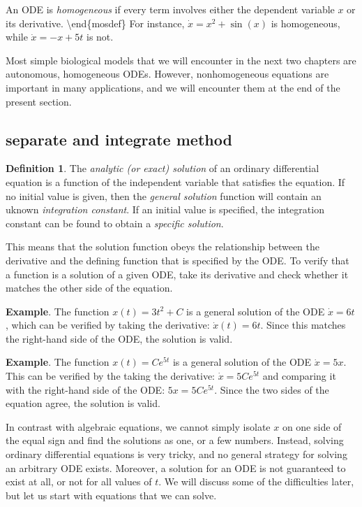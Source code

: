 \documentclass[
]{book}
\theoremstyle{definition}
\newtheorem{definition}{Definition}[chapter]
\theoremstyle{definition}
\theoremstyle{definition}
\theoremstyle{remark}
\begin{document}
An ODE is \emph{homogeneous} if every term involves either the dependent variable \(x\) or its derivative.
\textbackslash end\{mosdef\}
For instance, \(\dot x = x^2 + \sin(x)\) is homogeneous, while \(\dot x = -x + 5t\) is not.

Most simple biological models that we will encounter in the next two chapters are autonomous, homogeneous ODEs. However, nonhomogeneous equations are important in many applications, and we will encounter them at the end of the present section.

\hypertarget{separate-and-integrate-method}{%
\subsection{separate and integrate method}\label{separate-and-integrate-method}}

\begin{definition}
\protect\hypertarget{def:def-ode-sol}{}{\label{def:def-ode-sol} }The \emph{analytic (or exact) solution} of an ordinary differential equation is a function of the independent variable that satisfies the equation. If no initial value is given, then the \emph{general solution} function will contain an uknown \emph{integration constant}. If an initial value is specified, the integration constant can be found to obtain a \emph{specific solution}.
\end{definition}

This means that the solution function obeys the relationship between the derivative and the defining function that is specified by the ODE. To verify that a function is a solution of a given ODE, take its derivative and check whether it matches the other side of the equation.

\textbf{Example}. The function \(x(t) = 3t^2 +C\) is a general solution of the ODE \(\dot x = 6t\), which can be verified by taking the derivative: \(\dot x (t) = 6t\). Since this matches the right-hand side of the ODE, the solution is valid.

\textbf{Example}. The function \(x(t) = Ce^{5t}\) is a general solution of the ODE \(\dot x = 5x\). This can be verified by the taking the derivative: \(\dot x = 5C e^{5t}\) and comparing it with the right-hand side of the ODE: \(5x = 5 Ce^{5t}\). Since the two sides of the equation agree, the solution is valid.

In contrast with algebraic equations, we cannot simply isolate \(x\) on one side of the equal sign and find the solutions as one, or a few numbers. Instead, solving ordinary differential equations is very tricky, and no general strategy for solving an arbitrary ODE exists. Moreover, a solution for an ODE is not guaranteed to exist at all, or not for all values of \(t\). We will discuss some of the difficulties later, but let us start with equations that we can solve.
\end{document}
